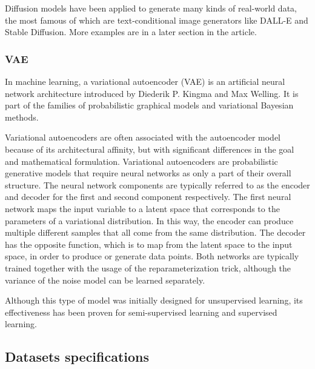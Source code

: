 \documentclass[11pt,a4paper]{report}
\begin{document}
\begin{multicols*}{2}
    Diffusion models have been applied to generate many kinds of real-world data, the most famous of which are text-conditional image generators like DALL-E and Stable Diffusion. More examples are in a later section in the article.

    \subsubsection{VAE}

    In machine learning, a variational autoencoder (VAE) is an artificial neural network architecture introduced by Diederik P. Kingma and Max Welling. It is part of the families of probabilistic graphical models and variational Bayesian methods.

    Variational autoencoders are often associated with the autoencoder model because of its architectural affinity, but with significant differences in the goal and mathematical formulation. Variational autoencoders are probabilistic generative models that require neural networks as only a part of their overall structure. The neural network components are typically referred to as the encoder and decoder for the first and second component respectively. The first neural network maps the input variable to a latent space that corresponds to the parameters of a variational distribution. In this way, the encoder can produce multiple different samples that all come from the same distribution. The decoder has the opposite function, which is to map from the latent space to the input space, in order to produce or generate data points. Both networks are typically trained together with the usage of the reparameterization trick, although the variance of the noise model can be learned separately.

    Although this type of model was initially designed for unsupervised learning, its effectiveness has been proven for semi-supervised learning and supervised learning.

    \subsection{Datasets specifications}


\end{multicols*}
\end{document}

